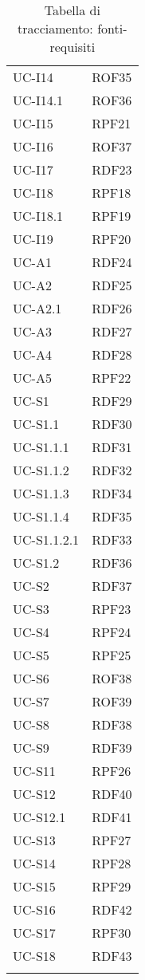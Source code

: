 \begin{longtable}{| p{5cm} | p{5cm} |}
		UC-I14 & ROF35 \\
		UC-I14.1 & ROF36 \\
		\rowcolor{LightGray}
		UC-I15 & RPF21 \\
		UC-I16 & ROF37 \\
		\rowcolor{LightGray}
		UC-I17 & RDF23\\
		UC-I18 & RPF18\\
		\rowcolor{LightGray}
		UC-I18.1 & RPF19 \\
		UC-I19 & RPF20 \\
		UC-A1 & RDF24\\
		\rowcolor{LightGray}
		UC-A2 & RDF25 \\
		UC-A2.1 & RDF26 \\
		\rowcolor{LightGray}
		UC-A3 & RDF27\\
		UC-A4 & RDF28 \\
		\rowcolor{LightGray}
		UC-A5 & RPF22\\
		UC-S1 & RDF29 \\
		\rowcolor{LightGray}
		UC-S1.1 & RDF30\\
		UC-S1.1.1 & RDF31\\
		\rowcolor{LightGray}
		UC-S1.1.2 & RDF32\\
		UC-S1.1.3 & RDF34\\%
		\rowcolor{LightGray}
		UC-S1.1.4 & RDF35\\%
		UC-S1.1.2.1 & RDF33\\
		\rowcolor{LightGray}
		UC-S1.2 & RDF36\\
		UC-S2 & RDF37\\
		\rowcolor{LightGray}
		UC-S3 & RPF23\\
		UC-S4 & RPF24\\
		\rowcolor{LightGray}
		UC-S5 & RPF25 \\
		UC-S6 & ROF38 \\
		\rowcolor{LightGray}
		UC-S7 & ROF39 \\
		UC-S8 & RDF38 \\
		\rowcolor{LightGray}
		UC-S9 & RDF39 \\
		\rowcolor{LightGray}
		UC-S11 & RPF26 \\
		UC-S12 & RDF40 \\
		\rowcolor{LightGray}
		UC-S12.1 & RDF41 \\
		UC-S13 & RPF27 \\
		\rowcolor{LightGray}
		UC-S14 & RPF28 \\
		UC-S15 & RPF29 \\
		\rowcolor{LightGray} 
		UC-S16 & RDF42\\
		UC-S17 & RPF30\\
		\rowcolor{LightGray}		
		UC-S18 & RDF43\\%
		\hline
		\caption{Tabella di tracciamento: fonti-requisiti}
\end{longtable}
